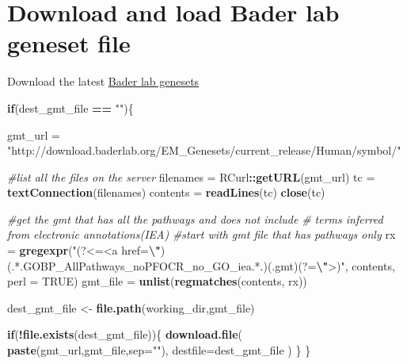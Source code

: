 \documentclass[
]{book}
\newenvironment{Shaded}{\begin{snugshade}}{\end{snugshade}}
\newcommand{\AttributeTok}[1]{\textcolor[rgb]{0.13,0.29,0.53}{#1}}
\newcommand{\CommentTok}[1]{\textcolor[rgb]{0.56,0.35,0.01}{\textit{#1}}}
\newcommand{\ConstantTok}[1]{\textcolor[rgb]{0.56,0.35,0.01}{#1}}
\newcommand{\ControlFlowTok}[1]{\textcolor[rgb]{0.13,0.29,0.53}{\textbf{#1}}}
\newcommand{\FunctionTok}[1]{\textcolor[rgb]{0.13,0.29,0.53}{\textbf{#1}}}
\newcommand{\NormalTok}[1]{#1}
\newcommand{\OtherTok}[1]{\textcolor[rgb]{0.56,0.35,0.01}{#1}}
\newcommand{\SpecialCharTok}[1]{\textcolor[rgb]{0.81,0.36,0.00}{\textbf{#1}}}
\newcommand{\StringTok}[1]{\textcolor[rgb]{0.31,0.60,0.02}{#1}}
\begin{document}
\section{Download and load Bader lab geneset file}\label{download-and-load-bader-lab-geneset-file}

Download the latest \href{https://download.baderlab.org/EM_Genesets/current_release/Human/}{Bader lab genesets}

\begin{Shaded}
\begin{Highlighting}[]
\ControlFlowTok{if}\NormalTok{(dest\_gmt\_file }\SpecialCharTok{==} \StringTok{""}\NormalTok{)\{}

\NormalTok{  gmt\_url }\OtherTok{=} \StringTok{"http://download.baderlab.org/EM\_Genesets/current\_release/Human/symbol/"}

  \CommentTok{\#list all the files on the server}
\NormalTok{  filenames }\OtherTok{=}\NormalTok{ RCurl}\SpecialCharTok{::}\FunctionTok{getURL}\NormalTok{(gmt\_url)}
\NormalTok{  tc }\OtherTok{=} \FunctionTok{textConnection}\NormalTok{(filenames)}
\NormalTok{  contents }\OtherTok{=} \FunctionTok{readLines}\NormalTok{(tc)}
  \FunctionTok{close}\NormalTok{(tc)}
  
  \CommentTok{\#get the gmt that has all the pathways and does not include }
  \CommentTok{\# terms inferred from electronic annotations(IEA)}
  \CommentTok{\#start with gmt file that has pathways only}
\NormalTok{  rx }\OtherTok{=} \FunctionTok{gregexpr}\NormalTok{(}\StringTok{"(?\textless{}=\textless{}a href=}\SpecialCharTok{\textbackslash{}"}\StringTok{)(.*.GOBP\_AllPathways\_noPFOCR\_no\_GO\_iea.*.)(.gmt)(?=}\SpecialCharTok{\textbackslash{}"}\StringTok{\textgreater{})"}\NormalTok{,}
\NormalTok{    contents, }\AttributeTok{perl =} \ConstantTok{TRUE}\NormalTok{)}
\NormalTok{  gmt\_file }\OtherTok{=} \FunctionTok{unlist}\NormalTok{(}\FunctionTok{regmatches}\NormalTok{(contents, rx))}
  
\NormalTok{  dest\_gmt\_file }\OtherTok{\textless{}{-}} \FunctionTok{file.path}\NormalTok{(working\_dir,gmt\_file)}
  
  \ControlFlowTok{if}\NormalTok{(}\SpecialCharTok{!}\FunctionTok{file.exists}\NormalTok{(dest\_gmt\_file))\{}
    \FunctionTok{download.file}\NormalTok{(}
      \FunctionTok{paste}\NormalTok{(gmt\_url,gmt\_file,}\AttributeTok{sep=}\StringTok{""}\NormalTok{),}
      \AttributeTok{destfile=}\NormalTok{dest\_gmt\_file}
\NormalTok{    )}
\NormalTok{  \}}
\NormalTok{\}}
\end{Highlighting}
\end{Shaded}
\end{document}
